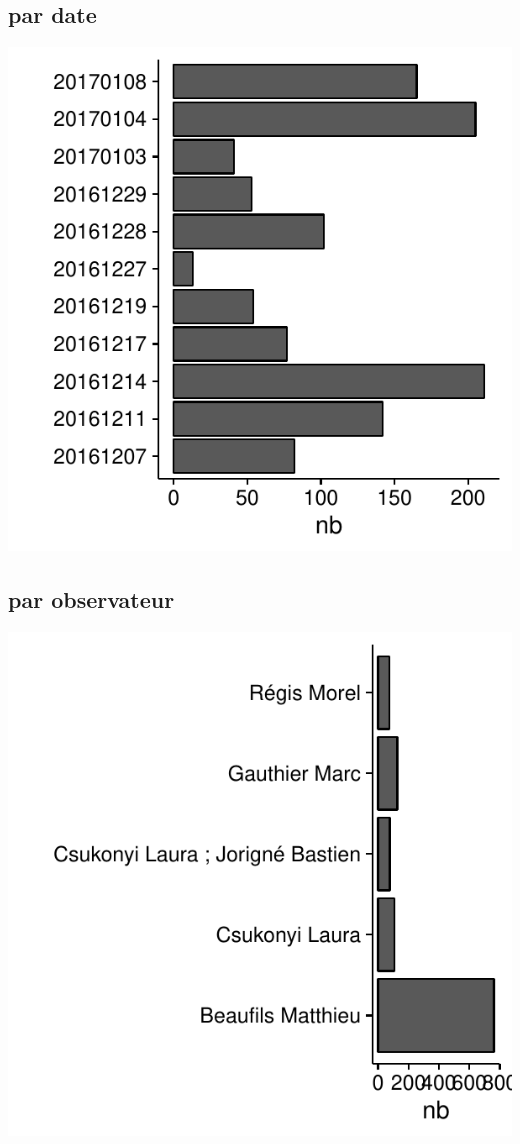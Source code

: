 \subsection{par date}
\includegraphics[width=\malargeurgraphique]{images/serena_stat_champ_OBSE_DATE.pdf}
\subsection{par observateur}
\includegraphics[width=\malargeurgraphique]{images/serena_stat_champ_OBSV_LIBEL.pdf}
\onecolumn
